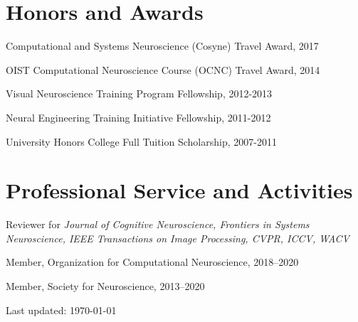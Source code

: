 \documentclass[10pt,letterpaper]{article}
\def\footerlink{} %
\renewenvironment{itemize}{
  \begin{list}{}{
    \setlength{\leftmargin}{1.5em}
    \setlength{\itemsep}{0.25em}
    \setlength{\parskip}{0pt}
    \setlength{\parsep}{0.25em}
  }
}{
  \end{list}
}
\begin{document}

\vspace{-0.25in}

\section*{Honors and Awards}
\vspace{-0.05in}
\begin{itemize}
  \setlength\itemsep{1pt}
  \item Computational and Systems Neuroscience (Cosyne) Travel Award, 2017
  \item OIST Computational Neuroscience Course (OCNC) Travel Award, 2014
  \item Visual Neuroscience Training Program Fellowship, 2012-2013
  \item Neural Engineering Training Initiative Fellowship, 2011-2012
  \item University Honors College Full Tuition Scholarship, 2007-2011
\end{itemize}

\vspace{-0.25in}

\section*{Professional Service and Activities}
\vspace{-0.05in}
\begin{itemize}
  \setlength\itemsep{1pt}
  \item Reviewer for \textit{Journal of Cognitive Neuroscience, Frontiers in Systems Neuroscience, IEEE Transactions on Image Processing, CVPR, ICCV, WACV}
  \item Member, Organization for Computational Neuroscience, 2018--2020
  \item Member, Society for Neuroscience, 2013--2020
\end{itemize}

\bigskip

\begin{center}
  \begin{footnotesize}
    Last updated: \today \\
    \href{\footerlink}{\texttt{\footerlink}}
  \end{footnotesize}
\end{center}
\end{document}
